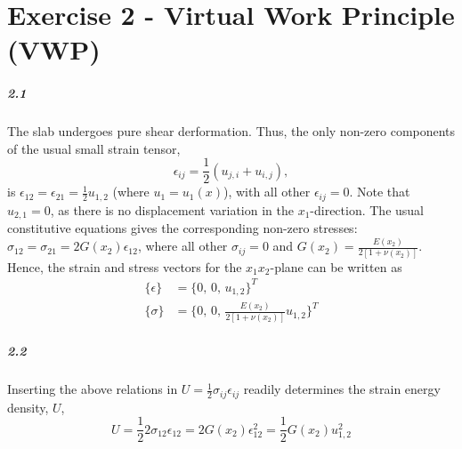 \setlength{\abovedisplayskip}{5pt}
\setlength{\belowdisplayskip}{5pt}
\chapter{Exercise 2 - Virtual Work Principle (VWP)}
\setlength{\columnsep}{0.5cm}
\begin{multicols}{2}
\paragraph{2.1} The slab undergoes pure shear derformation. Thus, the only non-zero components of the usual small strain tensor, 
\begin{equation}
    \epsilon_{ij}=\frac{1}{2}(u_{j,i}+u_{i,j}),
\end{equation}
is $\epsilon_{12}=\epsilon_{21}=\frac{1}{2}u_{1,2}$ (where $u_1=u_1(x)$), with all other $\epsilon_{ij}=0$. Note that $u_{2,1}=0$, as there is no displacement variation in the $x_1$-direction. The usual constitutive equations gives the corresponding non-zero stresses: $\sigma_{12}=\sigma_{21}=2G(x_2)\epsilon_{12}$, where all other $\sigma_{ij}=0$ and $G(x_2)=\frac{E(x_2)}{2[1+\nu(x_2)]}$. Hence, the strain and stress vectors for the $x_1x_2$-plane can be written as
\begin{align}
    \{\epsilon\} &= \{ 0,\, 0,\,  u_{1,2} \}^T \\
    \{\sigma\}   &= \{ 0,\, 0,\, \frac{E(x_2)}{2[1+\nu(x_2)]}u_{1,2} \}^T
\end{align}
\squeezeup
\squeezeup
\paragraph{2.2} Inserting the above relations in $U=\frac{1}{2}\sigma_{ij}\epsilon_{ij}$ readily determines the strain energy density, $U$,
\begin{equation}
    \nonumber
    U=\frac{1}{2}2\sigma_{12}\epsilon_{12} = 2G(x_2)\epsilon_{12}^2 = \frac{1}{2}G(x_2)u_{1,2}^2
\end{equation}
\squeezeup
\squeezeup

\end{multicols}

